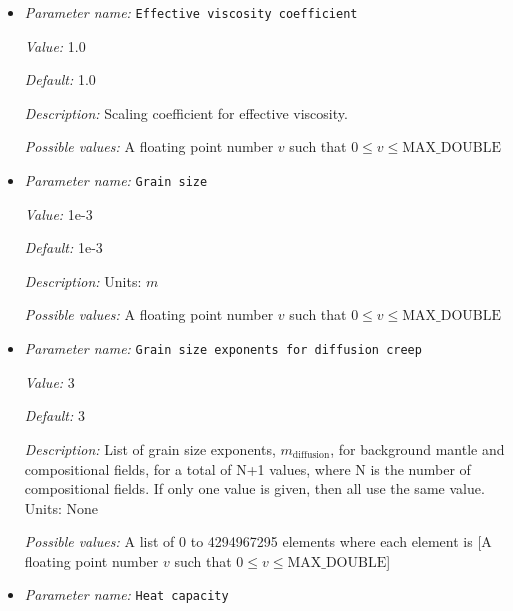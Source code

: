 \begin{itemize}
{\it Possible values:} A list of 0 to 4294967295 elements where each element is [A floating point number $v$ such that $0 \leq v \leq \text{MAX\_DOUBLE}$]
\item {\it Parameter name:} {\tt Effective viscosity coefficient}
\label{parameters:Material model/Diffusion dislocation/Effective viscosity coefficient}
\label{parameters:Material_20model/Diffusion_20dislocation/Effective_20viscosity_20coefficient}


{\it Value:} 1.0


{\it Default:} 1.0


{\it Description:} Scaling coefficient for effective viscosity.


{\it Possible values:} A floating point number $v$ such that $0 \leq v \leq \text{MAX\_DOUBLE}$
\item {\it Parameter name:} {\tt Grain size}
\label{parameters:Material model/Diffusion dislocation/Grain size}
\label{parameters:Material_20model/Diffusion_20dislocation/Grain_20size}


{\it Value:} 1e-3


{\it Default:} 1e-3


{\it Description:} Units: $m$


{\it Possible values:} A floating point number $v$ such that $0 \leq v \leq \text{MAX\_DOUBLE}$
\item {\it Parameter name:} {\tt Grain size exponents for diffusion creep}
\label{parameters:Material model/Diffusion dislocation/Grain size exponents for diffusion creep}
\label{parameters:Material_20model/Diffusion_20dislocation/Grain_20size_20exponents_20for_20diffusion_20creep}


{\it Value:} 3


{\it Default:} 3


{\it Description:} List of grain size exponents, $m_{\text{diffusion}}$, for background mantle and compositional fields, for a total of N+1 values, where N is the number of compositional fields. If only one value is given, then all use the same value.  Units: None


{\it Possible values:} A list of 0 to 4294967295 elements where each element is [A floating point number $v$ such that $0 \leq v \leq \text{MAX\_DOUBLE}$]
\item {\it Parameter name:} {\tt Heat capacity}
\label{parameters:Material model/Diffusion dislocation/Heat capacity}
\label{parameters:Material_20model/Diffusion_20dislocation/Heat_20capacity}



\end{itemize}

